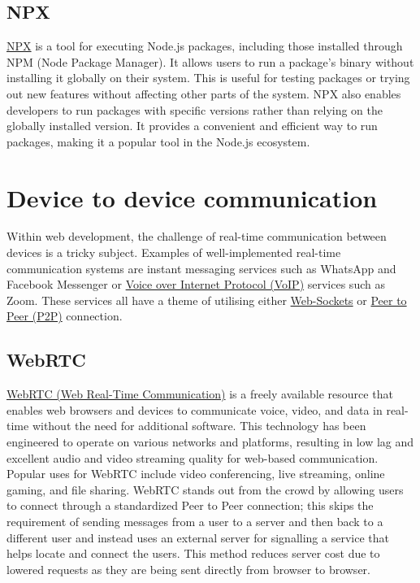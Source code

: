 \documentclass{l4proj}
\begin{document}
\subsection{NPX}
\href{https://docs.npmjs.com/cli/v7/commands/npx}{NPX} \text is a tool for executing Node.js packages, including those installed through NPM (Node Package Manager). It allows users to run a package's binary without installing it globally on their system. This is useful for testing packages or trying out new features without affecting other parts of the system. NPX also enables developers to run packages with specific versions rather than relying on the globally installed version. It provides a convenient and efficient way to run packages, making it a popular tool in the Node.js ecosystem.

\section{Device to device communication}

Within web development, the challenge of real-time communication between devices is a tricky subject. Examples of well-implemented real-time communication systems are instant messaging services such as WhatsApp and Facebook Messenger or \href{https://developer.mozilla.org/en-US/docs/Glossary/VoIP}{Voice over Internet Protocol (VoIP)} services such as Zoom. These services all have a theme of utilising either \href{https://developer.mozilla.org/en-US/docs/Web/API/WebSocket}{Web-Sockets} or \href{https://developer.mozilla.org/en-US/docs/Glossary/P2P}{Peer to Peer (P2P)} connection.

\subsection{WebRTC}
\href{https://developer.mozilla.org/en-US/docs/Web/API/WebRTC_API}{WebRTC (Web Real-Time Communication)} \text is a freely available resource that enables web browsers and devices to communicate voice, video, and data in real-time without the need for additional software. This technology has been engineered to operate on various networks and platforms, resulting in low lag and excellent audio and video streaming quality for web-based communication. Popular uses for WebRTC include video conferencing, live streaming, online gaming, and file sharing. WebRTC stands out from the crowd by allowing users to connect through a standardized Peer to Peer connection; this skips the requirement of sending messages from a user to a server and then back to a different user and instead uses an external server for signalling a service that helps locate and connect the users. This method reduces server cost due to lowered requests as they are being sent directly from browser to browser.
\end{document}
